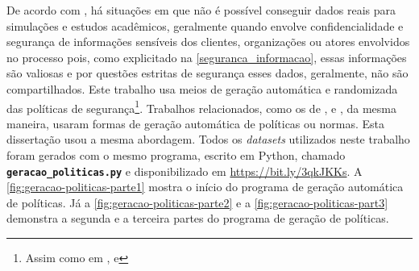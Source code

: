 De acordo com , há situações em que não é possível conseguir dados reais para simulações e estudos acadêmicos, geralmente quando envolve confidencialidade e segurança de informações sensíveis dos clientes, organizações ou atores envolvidos no processo pois, como explicitado na \autoref{seguranca_informacao}, essas informações são valiosas e por questões estritas de segurança esses dados, geralmente, não são compartilhados. Este trabalho usa meios de geração automática e randomizada das políticas de segurança\footnote{Assim como em ,  e }.
Trabalhos relacionados, como os de ,  e , da mesma maneira, usaram formas de geração automática de políticas ou normas. Esta dissertação usou a mesma abordagem. Todos os \textit{datasets} utilizados neste trabalho foram gerados com o mesmo programa, escrito em Python, chamado \texttt{\textbf{geracao\_politicas.py}}  e disponibilizado em \hyperlink{https://bit.ly/3qkJKKs}{https://bit.ly/3qkJKKs}. A \autoref{fig:geracao-politicas-parte1} mostra o início do programa de geração automática de políticas. Já a \autoref{fig:geracao-politicas-parte2} e a \autoref{fig:geracao-politicas-part3} demonstra a segunda e a terceira partes do programa de geração de políticas.
